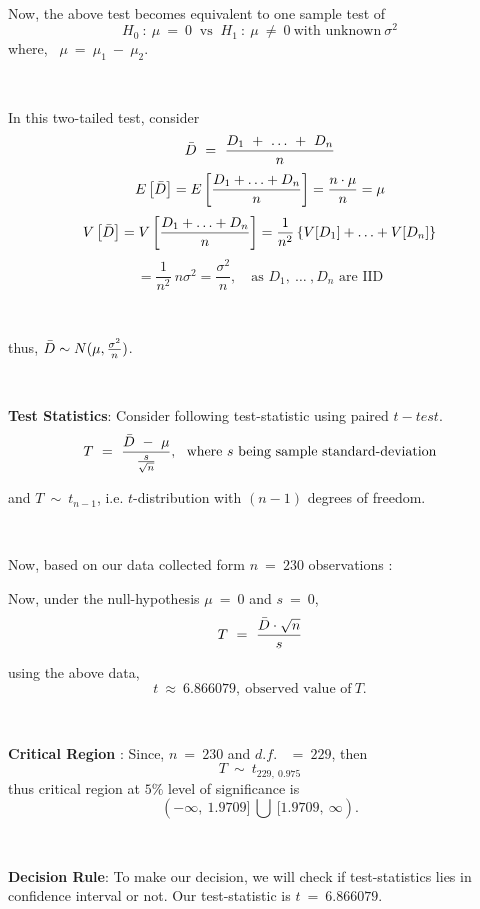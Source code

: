 \ 

Now, the above test becomes equivalent to one sample test of
$$H_{0} \ : \ \mu \ = \ 0 \ \text{  vs  } \ H_{1} \ : \ \mu \ \neq \ 0 \ \text{with unknown} \ \sigma^{2}$$
where, \ $\mu \ = \ \mu_{1} \ - \ \mu_{2}$.

\

 In this two-tailed test, consider
 $$\Bar{D} \ = \ \frac{D_{1} \ + \ \ldots \ + \ D_{n}}{n}$$
 \[E\left[\Bar{D}\right] = E\left[\frac{D_{1} + \ldots + D_{n}}{n}\right] = \frac{n\cdot\mu}{n} = \mu\]
 \[V\left[\Bar{D}\right] = V\left[\frac{D_{1} + \ldots + D_{n}}{n}\right] = \frac{1}{n^{2}} \left\{ V[D_{1}] + \ldots + V[D_{n}] \right\}\]
 \[= \frac{1}{n^{2}} \ n\sigma^{2} = \frac{\sigma^{2}}{n}, \quad \text{as $D_{1}, \ \ldots \ , D_{n}$ are IID}\]

 \ 

thus, $\Bar{D} \sim N(\mu, \frac{\sigma^{2}}{n})$.

 \ 

\textbf{Test Statistics}:
Consider following test-statistic using paired \textit{$t-test$}.
$$T \ = \ \frac{\Bar{D} \ - \ \mu}{\frac{s}{\sqrt{n}}} , \ \ \text{where $s$ being sample standard-deviation}$$

and $T \ \sim \ t_{n-1}$, i.e. $t$-distribution with $(n-1)$ degrees of freedom.

\ 

Now, based on our data collected form $n \ = \ 230$ observations : 
\begin{center}
\end{center}


\newpage 

Now, under the null-hypothesis $\mu \ = \ 0$ and $s \ = \ 0$,
$$T \ = \ \frac{\Bar{D} \cdot \sqrt{n}}{s}$$

using the above data,
$$t \ \approx \ 6.866079, \ \text{observed value of} \ T.$$

\ 

\textbf{Critical Region} :
Since, $n \ = \ 230$ and $d.f.$ \ $= \ 229$, then
$$T \ \sim \ t_{229, \ 0.975}$$
thus critical region at $5\%$ level of significance is
$$(-\infty , \ 1.9709] \ \bigcup \ [1.9709, \ \infty).$$

\ 

\textbf{Decision Rule}: To make our decision, we will check if test-statistics lies in confidence interval or not. Our test-statistic is $t \ = \ 6.866079$.

